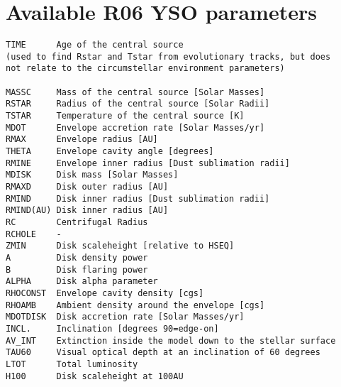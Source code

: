 \documentclass[letterpaper,11pt]{report}
\begin{document}
\chapter{Available R06 YSO parameters}
\label{s:defs}
\begin{verbatim}
TIME      Age of the central source
(used to find Rstar and Tstar from evolutionary tracks, but does
not relate to the circumstellar environment parameters)

MASSC     Mass of the central source [Solar Masses]
RSTAR     Radius of the central source [Solar Radii]
TSTAR     Temperature of the central source [K]
MDOT      Envelope accretion rate [Solar Masses/yr]
RMAX      Envelope radius [AU]
THETA     Envelope cavity angle [degrees]
RMINE     Envelope inner radius [Dust sublimation radii]
MDISK     Disk mass [Solar Masses]
RMAXD     Disk outer radius [AU]
RMIND     Disk inner radius [Dust sublimation radii]
RMIND(AU) Disk inner radius [AU]
RC        Centrifugal Radius
RCHOLE    -
ZMIN      Disk scaleheight [relative to HSEQ]
A         Disk density power
B         Disk flaring power
ALPHA     Disk alpha parameter
RHOCONST  Envelope cavity density [cgs]
RHOAMB    Ambient density around the envelope [cgs]
MDOTDISK  Disk accretion rate [Solar Masses/yr]
INCL.     Inclination [degrees 90=edge-on]
AV_INT    Extinction inside the model down to the stellar surface
TAU60     Visual optical depth at an inclination of 60 degrees     
LTOT      Total luminosity
H100      Disk scaleheight at 100AU
\end{verbatim}
\end{document}
